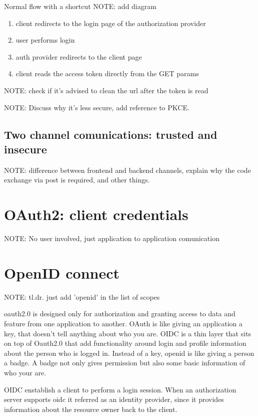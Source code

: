 \documentclass[11pt]{style}
\begin{document}
Normal flow with a shortcut
NOTE: add diagram
\begin{enumerate}
    \item client redirects to the login page of the authorization provider
    \item user performs login
    \item auth provider redirects to the client page
    \item client reads the access token directly from the GET params
\end{enumerate}

NOTE: check if it's advised to clean the url after the token is read

NOTE: Discuss why it's less secure, add reference to PKCE.
\subsection{Two channel comunications: trusted and insecure}
NOTE: difference between frontend and backend channels, explain why the code
exchange via post is required, and other things.

\section{OAuth2: client credentials}
NOTE: No user involved, just application to application comunication
\section{OpenID connect}
\label{openid}

NOTE: tl.dr. just add 'openid' in the list of scopes

oauth2.0 is designed only for authorization and granting access to data and
feature from one application to another.
OAuth is like giving an application a key, that doesn't tell anything about who
you are.
OIDC is a thin layer that sits on top of Oauth2.0 that add functionality around
login and profile information about the person who is logged in.
Instead of a key, openid is like giving a person a badge. A badge not only gives
permission but also some basic information of who your are.

OIDC enstablish a client to perform a login session.
When an authorization server supports oidc it referred as an identity provider,
since it provides information about the resource owner back to the client.
\end{document}
